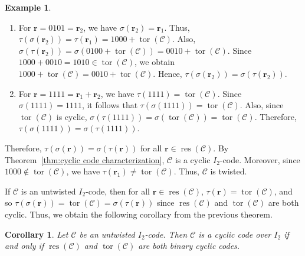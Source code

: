 \documentclass[12pt]{article}
\newtheorem{corollary}[corollary]{Corollary}
\theoremstyle{definition}
\newtheorem{example}[example]{Example}
\theoremstyle{plain}
\newcommand{\Blue}[1]{{ \color{blue} #1}}
\begin{document}
\begin{example}
\begin{enumerate}
\item[(iii)]
For $\mathbf r=0101=\mathbf{r}_2$, we have
$
\sigma(\mathbf{r}_2)=\mathbf{r}_1
$.
Thus,
$
\tau(\sigma(\mathbf{r}_2))
=
\tau(\mathbf{r}_1)
=
1000+\operatorname{tor}(\mathcal{C})
$.
Also,
$
\sigma(\tau(\mathbf{r}_2))
=
\sigma(0100+\operatorname{tor}(\mathcal{C}))
=
0010+\operatorname{tor}(\mathcal{C})
$.
Since
$
1000+0010=1010\in\operatorname{tor}(\mathcal{C})
$,
we obtain
$
1000+\operatorname{tor}(\mathcal{C})
=
0010+\operatorname{tor}(\mathcal{C})
$.
Hence,
$
\tau(\sigma(\mathbf{r}_2))=\sigma(\tau(\mathbf{r}_2))
$.

\item[(iv)]
For $\mathbf r=1111=\mathbf{r}_1+\mathbf{r}_2$, we have
$
\tau(1111)
=
\operatorname{tor}(\mathcal{C})
$.
Since $\sigma(1111)=1111$, it follows that
$
\tau(\sigma(1111))
=
\operatorname{tor}(\mathcal{C})
$.
Also, since $\operatorname{tor}(\mathcal{C})$ is cyclic,
$
\sigma(\tau(1111))
=
\sigma(\operatorname{tor}(\mathcal{C}))
=
\operatorname{tor}(\mathcal{C})
$.
Therefore,
$
\tau(\sigma(1111))=\sigma(\tau(1111))
$.

\end{enumerate}

Therefore,
$
\tau(\sigma(\mathbf r))
=
\sigma(\tau(\mathbf r))
$
for all
$
\mathbf r\in\operatorname{res}(\mathcal{C}).
$
By Theorem~\ref{thm:cyclic code characterization}, $\mathcal{C}$ is a cyclic $I_2$-code. Moreover, since
$
1000\notin \operatorname{tor}(\mathcal{C})
$,
we have
$
\tau(\mathbf{r}_1)\neq \operatorname{tor}(\mathcal{C})
$.
Thus, $\mathcal{C}$ is twisted.
\end{example}





If $\mathcal{C}$ is an untwisted $I_2$-code, then for all $\mathbf{r} \in \operatorname{res} ( \mathcal{C} )$, $\tau ( \mathbf{r} ) = \operatorname{tor} ( \mathcal{C} )$, and so $\tau ( \sigma ( \mathbf{r} ) ) = \operatorname{tor} ( \mathcal{C} ) = \sigma ( \tau ( \mathbf{r} ) )$ since $\operatorname{res} ( \mathcal{C} )$ and $\operatorname{tor} ( \mathcal{C} )$ are both cyclic. Thus, we obtain the following corollary from the previous theorem.


\begin{corollary}  \label{cor:char-untwisted}
Let $\mathcal{C}$ be an untwisted $I_2$-code. Then $ \mathcal{C}$ is a cyclic code over $I_2$ if and only if $\operatorname{res}(\mathcal{C})$ and $\operatorname{tor} (\mathcal{C}) $ are both binary cyclic codes.
\end{corollary}
\end{document}
